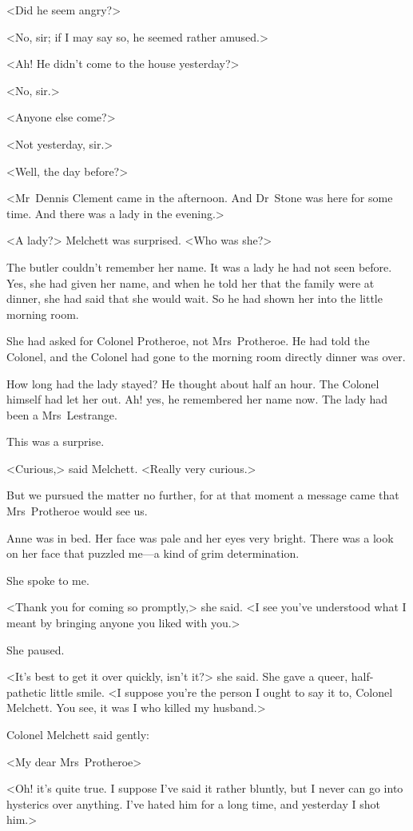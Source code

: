<Did he seem angry?>

<No, sir; if I may say so, he seemed rather amused.>

<Ah! He didn't come to the house yesterday?>

<No, sir.>

<Anyone else come?>

<Not yesterday, sir.>

<Well, the day before?>

<Mr~Dennis Clement came in the afternoon. And Dr~Stone was here for some time. And there was a lady in the evening.>

<A lady?> Melchett was surprised. <Who was she?>

The butler couldn't remember her name. It was a lady he had not seen before. Yes, she had given her name, and when he told her that the family were at dinner, she had said that she would wait. So he had shown her into the little morning room.

She had asked for Colonel Protheroe, not Mrs~Protheroe. He had told the Colonel, and the Colonel had gone to the morning room directly dinner was over.

How long had the lady stayed? He thought about half an hour. The Colonel himself had let her out. Ah! yes, he remembered her name now. The lady had been a Mrs~Lestrange.

This was a surprise.

<Curious,> said Melchett. <Really very curious.>

But we pursued the matter no further, for at that moment a message came that Mrs~Protheroe would see us.

Anne was in bed. Her face was pale and her eyes very bright. There was a look on her face that puzzled me—a kind of grim determination.

She spoke to me.

<Thank you for coming so promptly,> she said. <I see you've understood what I meant by bringing anyone you liked with you.>

She paused.

<It's best to get it over quickly, isn't it?> she said. She gave a queer, half-pathetic little smile. <I suppose you're the person I ought to say it to, Colonel Melchett. You see, it was I who killed my husband.>

Colonel Melchett said gently:

<My dear Mrs~Protheroe\longdash>

<Oh! it's quite true. I suppose I've said it rather bluntly, but I never can go into hysterics over anything. I've hated him for a long time, and yesterday I shot him.>

